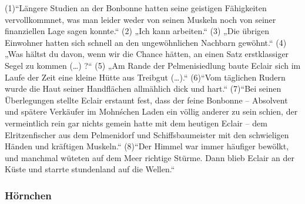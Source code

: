 (1)“Längere Studien an der Bonbonne hatten seine geistigen Fähigkeiten vervollkommnet, was man leider weder von seinen Muskeln noch von seiner finanziellen Lage sagen konnte.“
(2) „Ich kann arbeiten.“
(3) „Die übrigen Einwohner hatten sich schnell an den ungewöhnlichen Nachbarn gewöhnt.“
(4) „Was hältst du davon, wenn wir die Chance hätten, an einen Satz erstklassiger Segel zu kommen (…) ?“
(5) „Am Rande der Pelmenisiedlung baute Eclair sich im Laufe der Zeit eine kleine Hütte aus Treibgut (…).“ 
(6)“Vom täglichen Rudern wurde die Haut seiner Handflächen allmählich dick und hart.“
(7)“Bei seinen Überlegungen stellte Eclair erstaunt fest, dass der feine Bonbonne – Absolvent und spätere Verkäufer im Mohn\'schen Laden ein völlig anderer zu sein schien, der vermeintlich rein gar nichts gemein hatte mit dem heutigen Eclair – dem Elritzenfischer aus dem Pelmenidorf und Schiffsbaumeister mit den schwieligen Händen und kräftigen Muskeln.“
(8)“Der Himmel war immer häufiger bewölkt, und manchmal wüteten auf dem Meer richtige Stürme. Dann blieb Eclair an der Küste und starrte stundenland auf die Wellen.“


\subsubsection{Hörnchen}

